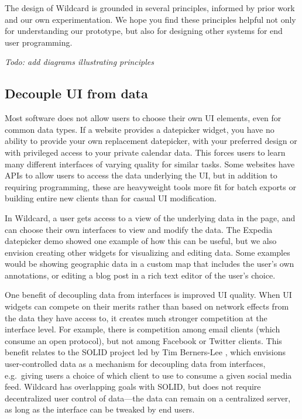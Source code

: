 \documentclass[english,submission]{programming}
\begin{document}
The design of Wildcard is grounded in several principles, informed by
prior work and our own experimentation. We hope you find these
principles helpful not only for understanding our prototype, but also
for designing other systems for end user programming.

\emph{Todo: add diagrams illustrating principles}

\hypertarget{decouple-ui-from-data}{%
\subsection{Decouple UI from data}\label{decouple-ui-from-data}}

Most software does not allow users to choose their own UI elements, even
for common data types. If a website provides a datepicker widget, you
have no ability to provide your own replacement datepicker, with your
preferred design or with privileged access to your private calendar
data. This forces users to learn many different interfaces of varying
quality for similar tasks. Some websites have APIs to allow users to
access the data underlying the UI, but in addition to requiring
programming, these are heavyweight tools more fit for batch exports or
building entire new clients than for casual UI modification.

In Wildcard, a user gets access to a view of the underlying data in the
page, and can choose their own interfaces to view and modify the data.
The Expedia datepicker demo showed one example of how this can be
useful, but we also envision creating other widgets for visualizing and
editing data. Some examples would be showing geographic data in a custom
map that includes the user's own annotations, or editing a blog post in
a rich text editor of the user's choice.

One benefit of decoupling data from interfaces is improved UI quality.
When UI widgets can compete on their merits rather than based on network
effects from the data they have access to, it creates much stronger
competition at the interface level. For example, there is competition
among email clients (which consume an open protocol), but not among
Facebook or Twitter clients. This benefit relates to the SOLID project
led by Tim Berners-Lee \autocite{berners-lee2018}, which envisions
user-controlled data as a mechanism for decoupling data from interfaces,
e.g.~giving users a choice of which client to use to consume a given
social media feed. Wildcard has overlapping goals with SOLID, but does
not require decentralized user control of data---the data can remain on
a centralized server, as long as the interface can be tweaked by end
users.
\end{document}
